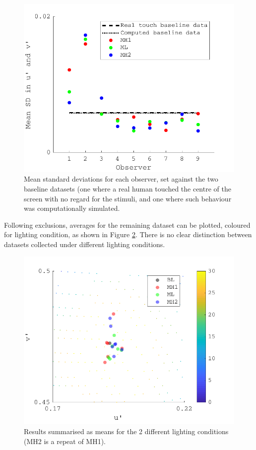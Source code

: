 \begin{figure}[hbtp] 
\includegraphics[max width=\textwidth]{figs/tablet/exp3excl.pdf} 
\caption{Mean standard deviations for each observer, set against the two baseline datasets (one where a real human touched the centre of the screen with no regard for the stimuli, and one where such behaviour was computationally simulated.}
\label{fig:exp3excl}
\end{figure}


Following exclusions, averages for the remaining dataset can be plotted, coloured for lighting condition, as shown in Figure \ref{fig:PAMELA_20180205_results}. There is no clear distinction between datasets collected under different lighting conditions.

\begin{figure}[hbtp] %
\includegraphics[max width=\textwidth]{figs/tablet/PAMELA_20180205_results.pdf} 
\caption{Results summarised as means for the 2 different lighting conditions (MH2 is a repeat of MH1).}
\label{fig:PAMELA_20180205_results}
\end{figure}

